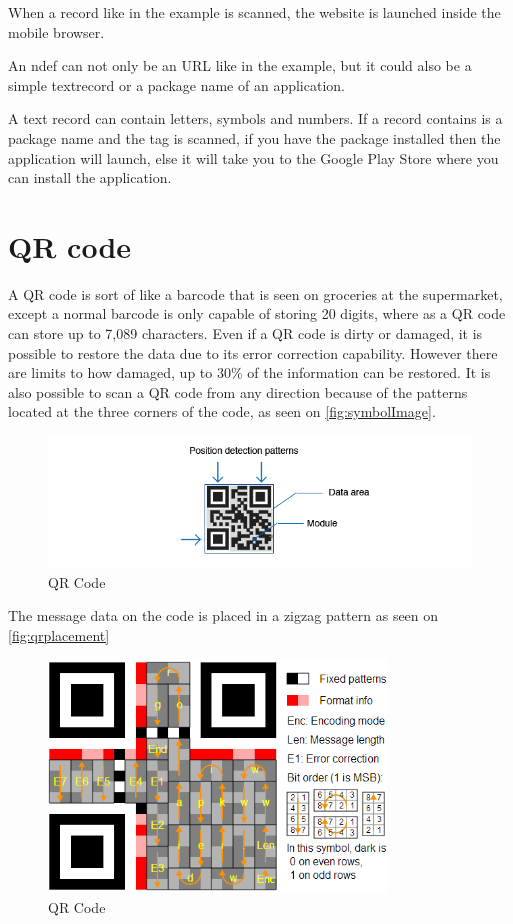 When a record like in the example is scanned, the website is launched inside the mobile browser. 

An \ac{ndef} can not only be an URL like in the example, but it could also be a simple textrecord or a package name of an application. 

A text record can contain letters, symbols and numbers. If a record contains is a package name and the tag is scanned, if you have the package installed then the application will launch, else it will take you to the Google Play Store where you can install the application. 

\section*{QR code}

A QR code is sort of like a barcode that is seen on groceries at the supermarket, except a normal barcode is only capable of storing 20 digits, where as a QR code can store up to 7,089 characters. Even if a QR code is dirty or damaged, it is possible to restore the data due to its error correction capability. However there are limits to how damaged, up to 30\% of the information can be restored. It is also possible to scan a QR code from any direction  because of the patterns located at the three corners of the code, as seen on \autoref{fig:symbolImage}. \citep{qrcode}

\begin{figure}[H]
\centering
\includegraphics[width=1.5\textwidth]{img/symbolImage.png}
\caption{QR Code\citep{qrcode}}
\label{fig:symbolImage}
\end{figure}

The message data on the code is placed in a zigzag pattern as seen on \autoref{fig:qrplacement} 

\begin{figure}[H]
\centering
\includegraphics[width=0.8\textwidth]{img/qrplacement.png}
\caption{QR Code\citep{qrcode}}
\label{fig:qrplacement}
\end{figure}

